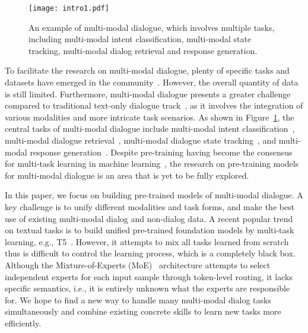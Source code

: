 \documentclass[11pt]{article}
\begin{document}
\begin{figure}[t]
    \small
    \centering
    \texttt{[image: intro1.pdf]}
    \caption{An example of multi-modal dialogue, which involves multiple tasks, including multi-modal intent classification, multi-modal state tracking, multi-modal dialog retrieval and response generation.}
    \label{intro}
\end{figure}

To facilitate the research on multi-modal dialogue, plenty of specific tasks and datasets have emerged in the community~\citep{das2017visual,shuster2018image,feng2022mmdialog,long2023spring}. However, the overall quantity of data is still limited. 
Furthermore, multi-modal dialogue presents a greater challenge compared to traditional text-only dialogue track~\citep{hui2021dynamic,he2022galaxy,si2022mining}, as it involves the integration of various modalities and more intricate task scenarios. As shown in Figure~\ref{intro}, the central tasks of multi-modal dialogue include multi-modal intent classification~\citep{zang2021photochat}, multi-modal dialogue retrieval~\citep{das2017visual,zang2021photochat}, multi-modal dialogue state tracking~\citep{liao2021mmconv}, and multi-modal response generation~\citep{kottur2021simmc}. 
Despite pre-training having become the consensus for multi-task learning in machine learning~\citep{devlin2018bert, radford2019language,radford2021learning}, the research on pre-training models for multi-modal dialogue is an area that is yet to be fully explored.

In this paper, we focus on building pre-trained models of multi-modal dialogue. 
A key challenge is to unify different modalities and task forms, and make the best use of existing multi-modal dialog and non-dialog data. A recent popular trend on textual tasks is to build unified pre-trained foundation models by multi-task learning, e.g., T5~\citep{raffel2020exploring}. However, it attempts to mix all tasks learned from scratch thus is difficult to control the learning process, which is a completely black box. Although the Mixture-of-Experts (MoE)~\citep{fedus2021switch,du2022glam} architecture attempts to select independent experts for each input sample through token-level routing, it lacks specific semantics, i.e., it is entirely unknown what the experts are responsible for.
We hope to find a new way to handle many multi-modal dialog tasks simultaneously and combine existing concrete skills to learn new tasks more efficiently.
\end{document}
